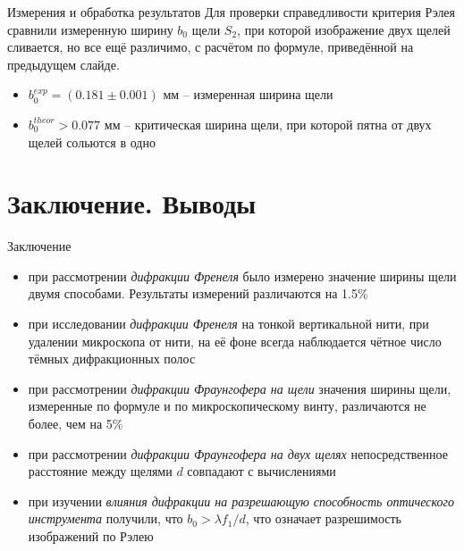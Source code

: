 \documentclass[11pt]{beamer} %
\begin{document}
   \begin{frame}{Измерения и обработка результатов}
        Для проверки справедливости критерия Рэлея сравнили измеренную ширину $b_0$ щели $S_2$, при которой изображение двух щелей сливается, но все ещё различимо, с расчётом по формуле, приведённой на предыдущем слайде.

        \begin{itemize}
            \item $b_0^{exp} = \left( 0.181 \pm 0.001 \right) \text{ мм}$ -- измеренная ширина щели
            \item $b_0^{theor} > 0.077 \text{ мм}$ -- критическая ширина щели, при которой пятна от двух щелей сольются в одно
        \end{itemize}
   \end{frame}

\section{Заключение. Выводы}
    \begin{frame}{Заключение}
        \begin{itemize}
            \item при рассмотрении \textit{дифракции Френеля} было измерено значение ширины щели двумя способами. Результаты измерений различаются на 1.5\%
            \item при исследовании \textit{дифракции Френеля} на тонкой вертикальной нити, при удалении микроскопа от нити, на её фоне всегда наблюдается чётное число тёмных дифракционных полос
            \item при рассмотрении \textit{дифракции Фраунгофера на щели} значения ширины щели, измеренные по формуле и по микроскопическому винту, различаются не более, чем на 5\%
            \item при рассмотрении \textit{дифракции Фраунгофера на двух щелях} непосредственное расстояние между щелями $d$ совпадают с вычислениями
            \item при изучении \textit{влияния дифракции на разрешающую способность оптического инструмента} получили, что $b_0 > \lambda f_1 /d$, что означает разрешимость изображений по Рэлею
        \end{itemize}
    \end{frame}
    
\end{document}
